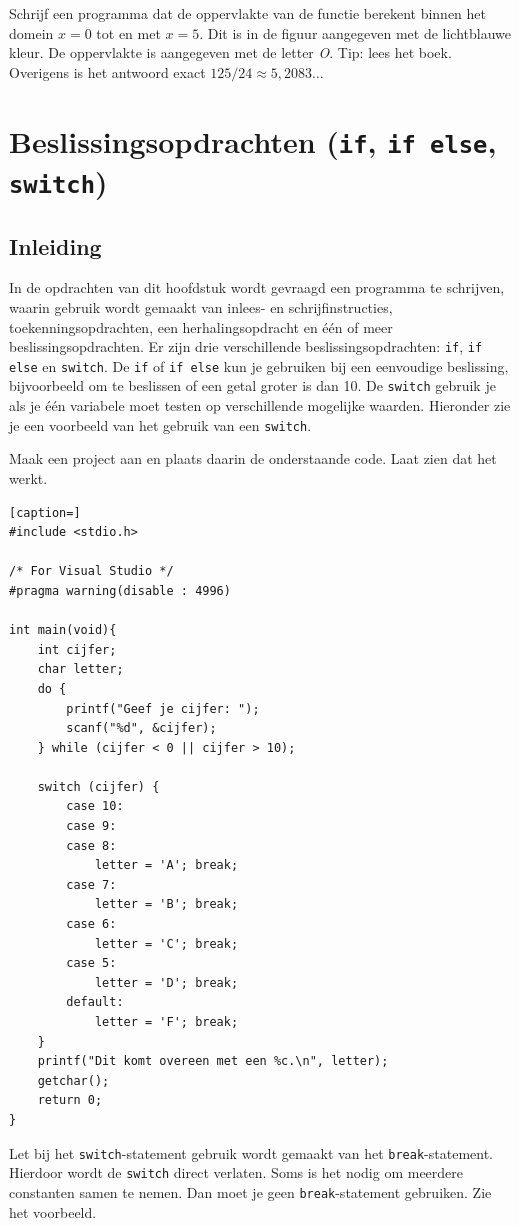 \documentclass[a4paper,10pt,fleqn,twoside]{article}
\begin{document}
Schrijf een programma dat de oppervlakte van de functie berekent binnen het domein $x=0$ tot en met $x=5$. Dit is in de figuur aangegeven met de lichtblauwe kleur. De oppervlakte is aangegeven met de letter \textsl{O}. Tip: lees het boek. Overigens is het antwoord exact $125/24 \approx 5,2083\ldots$


\clearpage
\section{Beslissingsopdrachten (\texttt{if}, \texttt{if else}, \texttt{switch})}

\subsection{Inleiding}
In de opdrachten van dit hoofdstuk wordt gevraagd een programma te schrijven, waarin gebruik wordt gemaakt van inlees- en schrijfinstructies, toekenningsopdrachten, een herhalingsopdracht en één of meer beslissingsopdrachten. Er zijn drie verschillende beslissingsopdrachten: \lstinline|if|, \lstinline|if else| en \lstinline|switch|. De \lstinline|if| of \lstinline|if else| kun je gebruiken bij een eenvoudige beslissing, bijvoorbeeld om te beslissen of een getal groter is dan 10. De \lstinline|switch| gebruik je als je één variabele moet testen op verschillende mogelijke waarden. Hieronder zie je een voorbeeld van het gebruik van een \lstinline|switch|.

Maak een project aan en plaats daarin de onderstaande code. Laat zien dat het werkt.

\begin{lstlisting}[caption=]
#include <stdio.h>

/* For Visual Studio */
#pragma warning(disable : 4996)

int main(void){
    int cijfer;
    char letter;
    do {
        printf("Geef je cijfer: ");
        scanf("%d", &cijfer);
    } while (cijfer < 0 || cijfer > 10);
    
    switch (cijfer) {
        case 10:
        case 9:
        case 8:
            letter = 'A'; break;
        case 7: 
            letter = 'B'; break;
        case 6: 
            letter = 'C'; break;
        case 5:
            letter = 'D'; break;
        default:
            letter = 'F'; break;
    }
    printf("Dit komt overeen met een %c.\n", letter);
    getchar();
    return 0;
}
\end{lstlisting}

Let bij het \lstinline|switch|-statement gebruik wordt gemaakt van het \lstinline|break|-statement. Hierdoor wordt de \lstinline|switch| direct verlaten. Soms is het nodig om meerdere constanten samen te nemen. Dan moet je geen \lstinline|break|-statement gebruiken. Zie het voorbeeld.
\end{document}
